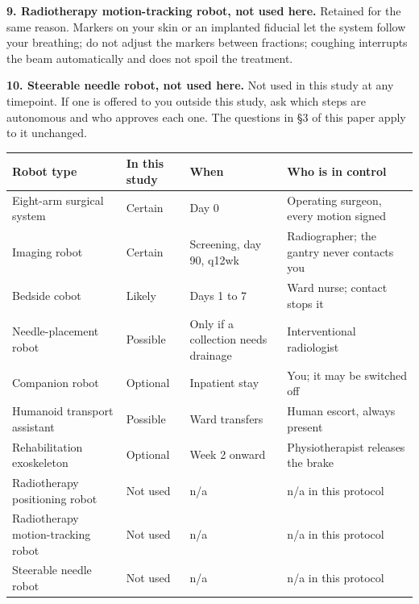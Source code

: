 \textbf{9. Radiotherapy motion-tracking robot, not used here.} Retained for the
same reason. Markers on your skin or an implanted fiducial let the system follow
your breathing; do not adjust the markers between fractions; coughing interrupts
the beam automatically and does not spoil the treatment.

\textbf{10. Steerable needle robot, not used here.} Not used in this study at
any timepoint. If one is offered to you outside this study, ask which steps are
autonomous and who approves each one. The questions in \S 3 of this paper apply
to it unchanged.

\vspace{0.30em}

\noindent\begin{tabularx}{\textwidth}{L{4.4cm} C{2.3cm} C{2.3cm} Y}
\toprule
\textbf{Robot type} & \textbf{In this study} & \textbf{When} & \textbf{Who is in control} \\
\midrule
Eight-arm surgical system & Certain & Day 0 & Operating surgeon, every motion signed \\
Imaging robot & Certain & Screening, day 90, q12wk & Radiographer; the gantry never contacts you \\
Bedside cobot & Likely & Days 1 to 7 & Ward nurse; contact stops it \\
Needle-placement robot & Possible & Only if a collection needs drainage & Interventional radiologist \\
Companion robot & Optional & Inpatient stay & You; it may be switched off \\
Humanoid transport assistant & Possible & Ward transfers & Human escort, always present \\
Rehabilitation exoskeleton & Optional & Week 2 onward & Physiotherapist releases the brake \\
Radiotherapy positioning robot & Not used & n/a & n/a in this protocol \\
Radiotherapy motion-tracking robot & Not used & n/a & n/a in this protocol \\
Steerable needle robot & Not used & n/a & n/a in this protocol \\
\bottomrule
\end{tabularx}

\vspace{0.30em}
